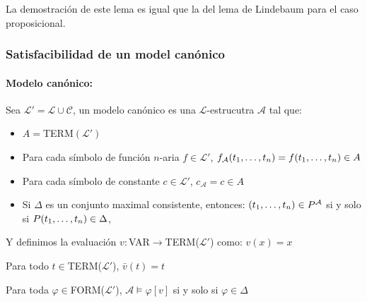 La demostración de este lema es igual que la del lema de Lindebaum para el caso proposicional.

\subsubsection{Satisfacibilidad de un model canónico}
\paragraph{Modelo canónico:} Sea $\mathcal{L}' = \mathcal{L} \cup \mathcal{C}$, un modelo canónico es una $\mathcal{L}$-estrucutra $\mathcal{A}$ tal que:
\begin{itemize}
	\item $A=$TERM$(\mathcal{L}')$
	\item Para cada símbolo de función $n$-aria $f\in\mathcal{L}'$, $f_\mathcal{A}(t_1,\dots, t_{n}) = f(t_1,\dots, t_{n})\in A$
	\item Para cada símbolo de constante $c\in\mathcal{L}'$, $c_\mathcal{A} = c \in A$
	\item Si $\Delta$ es un conjunto maximal consistente, entonces:  $(t_1,\dots, t_{n})\in P^\mathcal{A}$ si y solo si $P(t_1,\dots, t_{n})\in\Delta$,
\end{itemize}

Y definimos la evaluación $v:$VAR$\to$TERM($\mathcal{L}'$) como: $v(x) = x$

\begin{lema}
	Para todo $t\in$TERM($\mathcal{L}'$), $\bar{v}(t) = t$
\end{lema}

\begin{lema}\label{lema::paso4}
	Para toda $\varphi\in$FORM($\mathcal{L}'$), $\mathcal{A}\vDash\varphi[v]$ si y solo si $\varphi\in\Delta$
\end{lema}

